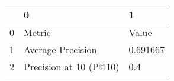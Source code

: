 \begin{tabular}{lll}
\toprule
{} &                       0 &         1 \\
\midrule
0 &                  Metric &     Value \\
1 &       Average Precision &  0.691667 \\
2 &  Precision at 10 (P@10) &       0.4 \\
\bottomrule
\end{tabular}
